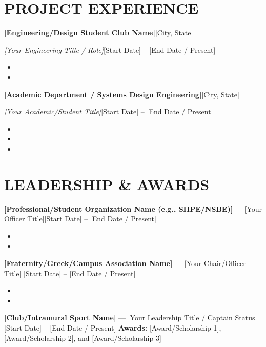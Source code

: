 \documentclass[10pt,letterpaper]{article}
\newenvironment{resumeentrywide}[4]{%
\vspace{1pt}\textbf{#1}\hfill {\small #2}\par
\textit{#3}\hfill {\small #4}\par
}{\vspace{0pt}}
\begin{document}
\section*{PROJECT EXPERIENCE}
\begin{resumeentrywide}
{[Engineering/Design Student Club Name]}{[City, State]}
{[Your Engineering Title / Role]}{[Start Date] – [End Date / Present]}
\end{resumeentrywide}
\begin{itemize}
    \item 
    \item 
\end{itemize}
\vspace{6pt}
\begin{resumeentrywide}
{[Academic Department / Systems Design Engineering]}{[City, State]}
{[Your Academic/Student Title]}{[Start Date] – [End Date / Present]}
\end{resumeentrywide}
\begin{itemize}
    \item 
    \item 
    \item 
\end{itemize}
\vspace{6pt}
\section*{LEADERSHIP \& AWARDS}
\textbf{[Professional/Student Organization Name (e.g., SHPE/NSBE)]} — [Your Officer Title]\hfill [Start Date] – [End Date / Present]
\begin{itemize}
\item 
\item 
\end{itemize}
\vspace{6pt}
\textbf{[Fraternity/Greek/Campus Association Name]} — [Your Chair/Officer Title] \hfill [Start Date] – [End Date / Present]
\begin{itemize}
    \item 
    \item 
\end{itemize}
\vspace{6pt}
\textbf{[Club/Intramural Sport Name]} — [Your Leadership Title / Captain Status] \hfill [Start Date] – [End Date / Present]
\vspace{6pt}
\textbf{Awards:} [Award/Scholarship 1], [Award/Scholarship 2], and [Award/Scholarship 3]
\end{document}
